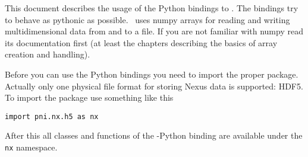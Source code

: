 
This document describes the usage of the Python bindings to \pninx. 
The bindings try to behave as pythonic as possible. 
\pninx\ uses numpy arrays for reading and writing multidimensional data from and
to a file. If you are not familiar with numpy read its documentation first (at
least the chapters describing the basics of array creation and handling). 

Before you can use the Python bindings you need to import the proper package. 
Actually only one physical file format for storing Nexus data is supported:
HDF5.
To import the package use something like this
\begin{verbatim}
import pni.nx.h5 as nx
\end{verbatim}
After this all classes and functions of the \pninx-Python binding are available
under the {\tt nx} namespace.
